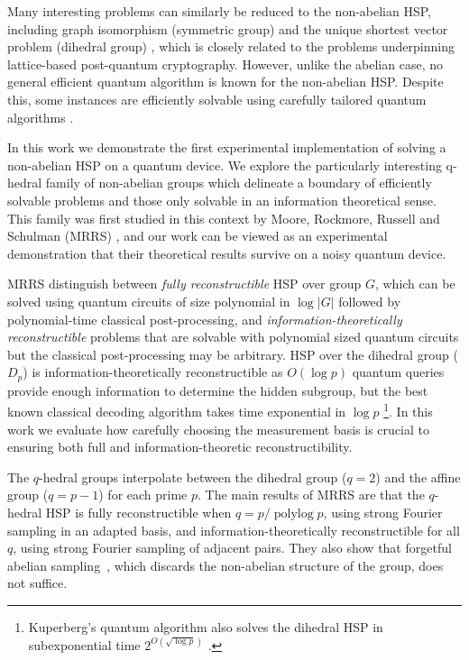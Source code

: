 \documentclass[aps,floatfix,10pt,amssymb,amsfont,amsmath,superscriptaddress,float,nofootinbib,longbibliography,nobalancelastpage,twocolumn]{revtex4-2}
\begin{document}
Many interesting problems can similarly be reduced to the non-abelian HSP, including graph isomorphism (symmetric group) \cite{beals1997quantum, hallgren2010limitations} and the unique shortest vector problem (dihedral group) \cite{regev2004quantum}, which is closely related to the problems underpinning lattice-based post-quantum cryptography. However, unlike the abelian case, no general efficient quantum algorithm is known for the non-abelian HSP. Despite this, some instances are efficiently solvable using carefully tailored quantum algorithms \cite{hallgren2000normal, bacon2005optimal, moore2007power, grigni2001quantum, ivanyos2001efficient, friedl2014hidden, morales2026hidden, Inui_2007}.

In this work we demonstrate the first experimental implementation of solving a non-abelian HSP on a quantum device. We explore the particularly interesting q-hedral family of non-abelian groups which delineate a boundary of efficiently solvable problems and those only solvable in an information theoretical sense. This family was first studied in this context by Moore, Rockmore, Russell and Schulman (MRRS) \cite{moore2002hidden, moore2007power}, and our work can be viewed as an experimental demonstration that their theoretical results survive on a noisy quantum device.

MRRS distinguish between \emph{fully reconstructible} HSP over group $G$, which can be solved using quantum circuits of size polynomial in $\log|G|$ followed by polynomial-time classical post-processing, and \emph{information-theoretically reconstructible} problems that are solvable with polynomial sized quantum circuits but the classical post-processing may be arbitrary. HSP over the dihedral group ($D_p$) is information-theoretically reconstructible as $O(\log p)$ quantum queries provide enough information to determine the hidden subgroup, but the best known classical decoding algorithm takes time exponential in $\log p$ \cite{ettinger1999quantum}\footnote{Kuperberg’s quantum algorithm also solves the dihedral HSP in subexponential time $2^{O(\sqrt{\log p})}$ \cite{kuperberg2005subexponential}.}. In this work we evaluate how carefully choosing the measurement basis is crucial to ensuring both full and information-theoretic reconstructibility.

The $q$-hedral groups interpolate between the dihedral group ($q=2$) and the affine group ($q=p-1$) for each prime $p$. The main results of MRRS are that the $q$-hedral HSP is fully reconstructible when $q = p/\operatorname{polylog} p$, using strong Fourier sampling in an adapted basis, and information-theoretically reconstructible for all $q$, using strong Fourier sampling of adjacent pairs. They also show that forgetful abelian sampling~\cite{ettinger1999quantum}, which discards the non-abelian structure of the group, does not suffice.
\end{document}
